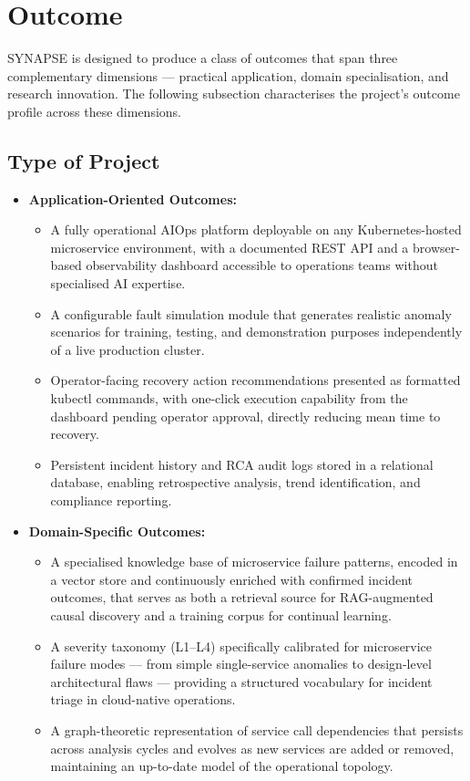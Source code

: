 \section{Outcome}

\hspace*{0.3in} SYNAPSE is designed to produce a class of outcomes that span three complementary dimensions — practical application, domain specialisation, and research innovation. The following subsection characterises the project's outcome profile across these dimensions.\\

\subsection{Type of Project}

\begin{itemize}

    \item \textbf{Application-Oriented Outcomes:}
    \begin{itemize}
        \item A fully operational AIOps platform deployable on any Kubernetes-hosted microservice environment, with a documented REST API and a browser-based observability dashboard accessible to operations teams without specialised AI expertise.
        \item A configurable fault simulation module that generates realistic anomaly scenarios for training, testing, and demonstration purposes independently of a live production cluster.
        \item Operator-facing recovery action recommendations presented as formatted kubectl commands, with one-click execution capability from the dashboard pending operator approval, directly reducing mean time to recovery.
        \item Persistent incident history and RCA audit logs stored in a relational database, enabling retrospective analysis, trend identification, and compliance reporting.
    \end{itemize}

    \item \textbf{Domain-Specific Outcomes:}
    \begin{itemize}
        \item A specialised knowledge base of microservice failure patterns, encoded in a vector store and continuously enriched with confirmed incident outcomes, that serves as both a retrieval source for RAG-augmented causal discovery and a training corpus for continual learning.
        \item A severity taxonomy (L1–L4) specifically calibrated for microservice failure modes — from simple single-service anomalies to design-level architectural flaws — providing a structured vocabulary for incident triage in cloud-native operations.
        \item A graph-theoretic representation of service call dependencies that persists across analysis cycles and evolves as new services are added or removed, maintaining an up-to-date model of the operational topology.
    \end{itemize}


\end{itemize}
